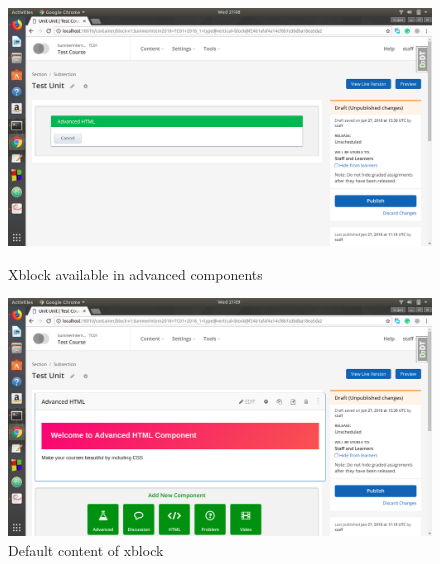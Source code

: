 \begin{figure}[ht]
  \centering
  \includegraphics[width=\textwidth]{images/demo_1}
  \caption{Xblock available in advanced components}

  \vspace*{\floatsep}

  \includegraphics[width=\textwidth]{images/demo_2}
  \caption{Default content of xblock}
\end{figure}


